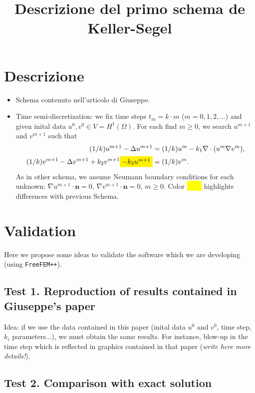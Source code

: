 \documentclass[a4wide]{article}
\title{Descrizione del primo schema de Keller-Segel}
\newcommand{\um}{u^m}
\newcommand{\umm}{u^{m+1}}
\newcommand{\vm}{v^m}
\newcommand{\vmm}{v^{m+1}}
\newcommand{\grad}{\nabla}
\renewcommand{\div}{\nabla\cdot}
\newcommand{\nn}{\mathbf{n}}
\newcommand{\hm}[1]{\colorbox{yellow}{\ensuremath{#1}}}
\begin{document}
\maketitle

\section{Descrizione}

\begin{itemize}
\item Schema contenuto nell'articolo di Giuseppe.
\item Time
  semi-discretization: we fix time steps $t_m=k\cdot m$
  ($m=0,1,2,...$) and given inital data $u^0,v^0 \in
  V=H^1(\Omega)$.
  For each find $m\ge 0$, we search $\umm$ and $\vmm$ such that
  \begin{align}
    \label{eq:ks.1}
    (1/k) \umm - \Delta \umm &= (1/k) \um - k_1 \div(\um \grad \vm),
    \\
    \label{eq:ks.2}
    (1/k) \vmm - \Delta \vmm + k_2 \vmm \hm{- k_3 \umm} &= (1/k) \vm .
  \end{align}
  As in other schema, we assume Neumann boundary conditions for each unknown:
  $\grad \umm \cdot \nn=0$, $\grad \vmm \cdot \nn=0$, $m\ge 0$.
  Color \hm{\qquad\rule{0pt}{1ex}} highlights differences with previous Schema.
\end{itemize}

\section{Validation}
Here we propose some ideas to validate the software
which we are developing (using \texttt{FreeFEM++}).

\subsection*{Test 1. Reproduction of results contained in Giuseppe's paper}

Idea: if we use the data contained in this paper (inital data $u^0$
and $v^0$, time step, $k_i$ parameters...), we must obtain the same
results. For instance, blow-up in the time step which is reflected in
graphics contained in that paper (\textit{write here more details!}).

\subsection*{Test 2. Comparison with exact solution}
\end{document}
